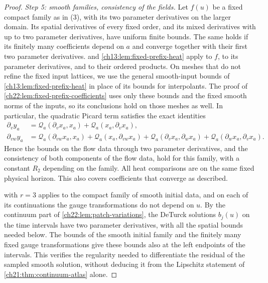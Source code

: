 \begin{proof}
\emph{Step 5: smooth families, consistency of the fields.} Let $f(u)$ be a fixed compact family as in (3), with its two parameter derivatives on the larger domain. Its spatial derivatives of every fixed order, and its mixed derivatives with up to two parameter derivatives, have uniform finite bounds. The same holds if its finitely many coefficients depend on $a$ and converge together with their first two parameter derivatives.  and \cref{ch13:lem:fixed-prefix-heat} apply to $f$, to its parameter derivatives, and to their ordered products. On meshes that do not refine the fixed input lattices, we use the general smooth-input bounds of \cref{ch13:lem:fixed-prefix-heat} in place of its bounds for interpolants. The proof of \cref{ch22:lem:fixed-prefix-coefficients} uses only these bounds and the fixed smooth norms of the inputs, so its conclusions hold on those meshes as well. In particular, the quadratic Picard term satisfies the exact identities
\[
 \begin{split}
 \partial_vy_a&=\mathcal Q_a(\partial_vx_a,x_a)+\mathcal Q_a(x_a,\partial_vx_a),\\
 \partial_{vw}y_a&=\mathcal Q_a(\partial_{vw}x_a,x_a)+\mathcal Q_a(x_a,\partial_{vw}x_a)
 +\mathcal Q_a(\partial_vx_a,\partial_wx_a)+\mathcal Q_a(\partial_wx_a,\partial_vx_a).
 \end{split}
\]
Hence the bounds on the flow data through two parameter derivatives, and the consistency of both components of the flow data, hold for this family, with a constant $R_2$ depending on the family. All heat comparisons are on the same fixed physical horizon. This also covers coefficients that converge as described.

 with $r=3$ applies to the compact family of smooth initial data, and on each of its continuations the gauge transformations do not depend on $u$. By the continuum part of \cref{ch22:lem:patch-variations}, the DeTurck solutions $b_j(u)$ on the time intervals have two parameter derivatives, with all the spatial bounds needed below. The bounds of the smooth initial family and the finitely many fixed gauge transformations give these bounds also at the left endpoints of the intervals. This verifies the regularity needed to differentiate the residual of the sampled smooth solution, without deducing it from the Lipschitz statement of \cref{ch21:thm:continuum-atlas} alone.


\end{proof}
